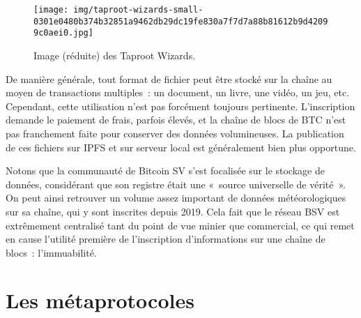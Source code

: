 \begin{figure}[h]
  \centering
  \texttt{[image: img/taproot-wizards-small-0301e0480b374b32851a9462db29dc19fe830a7f7d7a88b81612b9d42099c0aei0.jpg]}
  \caption{Image (réduite) des Taproot Wizards.}
  \label{fig:taproot-wizards}
\end{figure}

De manière générale, tout format de fichier peut être stocké sur la chaîne au moyen de transactions multiples~: un document, un livre, une vidéo, un jeu, etc. Cependant, cette utilisation n'est pas forcément toujours pertinente. L'inscription demande le paiement de frais, parfois élevés, et la chaîne de blocs de BTC n'est pas franchement faite pour conserver des données volumineuses. La publication de ces fichiers sur IPFS et sur serveur local est généralement bien plus opportune.

Notons que la communauté de Bitcoin SV s'est focalisée sur le stockage de données, considérant que son registre était une «~source universelle de vérité~». On peut ainsi retrouver un volume assez important de données météorologiques sur sa chaîne, qui y sont inscrites depuis 2019. Cela fait que le réseau BSV est extrêmement centralisé tant du point de vue minier que commercial, ce qui remet en cause l'utilité première de l'inscription d'informations sur une chaîne de blocs~: l'immuabilité.

\section*{Les métaprotocoles}

